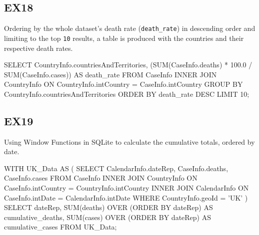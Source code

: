 \documentclass[]{article}
\begin{document}
\subsection{EX18}
Ordering by the whole dataset's death rate (\verb|death_rate|) in descending order and limiting to the top \verb|10| results, a table is produced with the countries and their respective death rates.
\begin{ffcode}
SELECT
    CountryInfo.countriesAndTerritories,
    (SUM(CaseInfo.deaths) * 100.0 / SUM(CaseInfo.cases)) AS death_rate
FROM CaseInfo
INNER JOIN CountryInfo ON CountryInfo.intCountry = CaseInfo.intCountry
GROUP BY CountryInfo.countriesAndTerritories
ORDER BY death_rate DESC
LIMIT 10;
\end{ffcode}
\subsection{EX19}
Using Window Functions in SQLite to calculate the cumulative totals, ordered by date.
\begin{ffcode}
WITH UK_Data AS (
    SELECT
        CalendarInfo.dateRep,
        CaseInfo.deaths,
        CaseInfo.cases
    FROM CaseInfo
    INNER JOIN CountryInfo ON CaseInfo.intCountry = CountryInfo.intCountry
    INNER JOIN CalendarInfo ON CaseInfo.intDate = CalendarInfo.intDate
    WHERE CountryInfo.geoId = 'UK'
)
SELECT
    dateRep,
    SUM(deaths) OVER (ORDER BY dateRep) AS cumulative_deaths,
    SUM(cases) OVER (ORDER BY dateRep) AS cumulative_cases
FROM UK_Data;
\end{ffcode}
\end{document}
